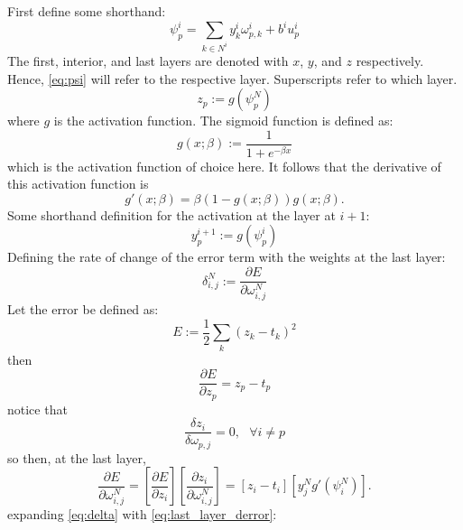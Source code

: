 \documentclass{article}
\begin{document}
First define some shorthand:
\begin{equation} \label{eq:psi}
\psi^i_p = \sum_{k \in N^i} y_k^i \omega_{p,k}^i + b^iu_p^i
\end{equation}
%
The first, interior, and last layers are denoted with $x$, $y$, and $z$ respectively. Hence, \eqref{eq:psi} will refer to the respective layer. Superscripts refer to which layer.
%
\begin{equation} \label{eq:z}
z_p := g(\psi_p^N)
\end{equation}
%
where $g$ is the activation function. The sigmoid function is defined as:
%
\begin{equation} \label{eq:g}
g(x;\beta) := \frac{1}{1 + e^{-\beta x}}
\end{equation}
%
which is the activation function of choice here.
It follows that the derivative of this activation function is
%
\begin{equation} \label{eq:gp}
g'(x;\beta) = \beta \left( 1 - g(x;\beta) \right) g(x; \beta).
\end{equation}
%
Some shorthand definition for the activation at the layer at $i+1$:
%
\begin{equation} \label{eq:z}
y_p^{i+1} := g(\psi_p^i)
\end{equation}
%
Defining the rate of change of the error term with the weights at the last layer:
%
\begin{equation} \label{eq:delta}
\delta_{i,j}^N := \frac{\partial E}{\partial \omega_{i,j}^N}
\end{equation}
%
Let the error be defined as:
%
\begin{equation} \label{eq:error}
E := \frac{1}{2} \sum_k (z_k - t_k)^2
\end{equation}
%
then
%
\begin{equation} \label{eq:derror}
\frac{\partial E}{\partial z_p} = z_p - t_p
\end{equation}
%
notice that
%
\begin{equation} \label{eq:last_layer_derror_eq_0}
\frac{\delta z_i}{\delta \omega_{p,j}} = 0, \ \ \ \forall i \neq p
\end{equation}
%
so then, at the last layer,
%
\begin{equation} \label{eq:last_layer_derror}
\frac{\partial E}{\partial \omega_{i,j}^N} =
\left[ \frac{\partial E}{\partial z_i} \right] \left[ \frac{\partial z_i}{\partial \omega_{i, j}^N} \right] =
\left[ z_i - t_i \right] \left[ y_j^N g' (\psi_i^N) \right].
\end{equation}
%
expanding \eqref{eq:delta} with \eqref{eq:last_layer_derror}:
\end{document}
